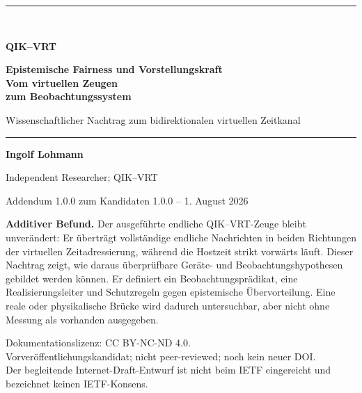 \documentclass[11pt,a4paper]{article}
\theoremstyle{remark}
\newcommand{\statusbox}[2]{%
  \par\medskip\noindent
  \colorbox{#1}{\parbox{\dimexpr\linewidth-2\fboxsep\relax}{#2}}%
  \par\medskip
}
\begin{document}

\hypersetup{pageanchor=false}
\begin{titlepage}
  \thispagestyle{empty}
  \vspace*{10mm}
  {\color{QBlue}\rule{\textwidth}{1.4pt}}\\[1.0em]
  {\Huge\bfseries QIK--VRT\par}
  \vspace{0.28em}
  {\LARGE\bfseries Epistemische Fairness und Vorstellungskraft\\[0.12em]
  Vom virtuellen Zeugen\\[0.12em]
  zum Beobachtungssystem\par}
  \vspace{0.9em}
  {\LARGE Wissenschaftlicher Nachtrag zum bidirektionalen virtuellen Zeitkanal\par}
  \vspace{1.0em}
  {\color{QBlue}\rule{\textwidth}{0.6pt}}

  \vfill
  {\large\textbf{Ingolf Lohmann}\par}
  \vspace{0.35em}
  {\normalsize Independent Researcher; QIK--VRT\par}
  \vspace{0.35em}
  {\normalsize Addendum 1.0.0 zum Kandidaten 1.0.0 -- 1. August 2026\par}

  \vfill
  \statusbox{QLight}{
    \textbf{Additiver Befund.}
    Der ausgeführte endliche QIK--VRT-Zeuge bleibt unverändert: Er überträgt
    vollständige endliche Nachrichten in beiden Richtungen der virtuellen
    Zeitadressierung, während die Hostzeit strikt vorwärts läuft. Dieser
    Nachtrag zeigt, wie daraus überprüfbare Geräte- und
    Beobachtungshypothesen gebildet werden können. Er definiert ein
    Beobachtungsprädikat, eine Realisierungsleiter und Schutzregeln gegen
    epistemische Übervorteilung. Eine reale oder physikalische Brücke wird
    dadurch untersuchbar, aber nicht ohne Messung als vorhanden ausgegeben.
  }

  \vfill
  {\small
    Dokumentationslizenz: CC BY-NC-ND 4.0.\\
    Vorveröffentlichungskandidat; nicht peer-reviewed; noch kein neuer DOI.\\
    Der begleitende Internet-Draft-Entwurf ist nicht beim IETF eingereicht
    und bezeichnet keinen IETF-Konsens.
  }
\end{titlepage}
\hypersetup{pageanchor=true}
\setcounter{page}{1}
\end{document}
